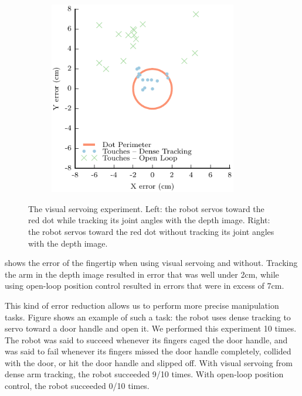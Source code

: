 \begin{figure}[width=1.0\textwidth]
\begin{subfigure}{0.5\textwidth}
	\includegraphics[width=0.9\textwidth]{img/dense_tracking/dots}
	\caption{}
	\label{fig:touching_data}
	\end{subfigure} 
\caption{The visual servoing experiment. Left: the robot servos toward the red dot while tracking its joint angles with the depth image. Right: the robot servos toward the red dot without tracking its joint angles with the depth image.}
\label{fig:touching_track}
\end{figure}

 shows the error of the fingertip when using visual servoing and without. Tracking the arm in the depth image resulted in error that was well under 2cm, while using open-loop position control resulted in errors that were in excess of 7cm. 

This kind of error reduction allows us to perform more precise manipulation tasks. Figure  shows an example of such a task: the robot uses dense tracking to servo toward a door handle and open it. We performed this experiment 10 times. The robot was said to succeed whenever its fingers caged the door handle, and was said to fail whenever its fingers missed the door handle completely, collided with the door, or hit the door handle and slipped off. With visual servoing from dense arm tracking, the robot succeeded 9/10 times. With open-loop position control, the robot succeeded 0/10 times.

